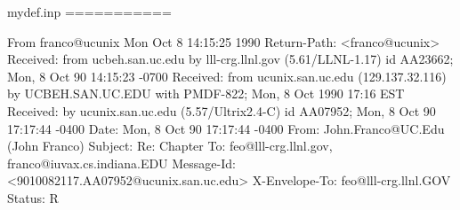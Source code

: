 mydef.inp
===========


\newcommand{\ie}{{\em i.e.}}
\newcommand{\eg}{{\em e.g.}}
\newcommand{\etc}{{\em etc.}}
\newcommand{\vs}{{\em vs.}}
\newcommand{\cf}{{\em cf.}}
\newcommand{\etal}{{\em et al.}}
\newcommand{\via}{{\em via}}


\newcommand{\g}{\gamma}
\newcommand{\r}{\rho}
\renewcommand{\l}{\lambda} %

\newcommand{\lam}{$\lambda$}

\newcommand{\sbv}[1]{\hbox{\([\![\)}\hbox{\svbt{#1}}\hbox{\(]\!]\)}}
\newcommand{\sbtt}[1]{\hbox{\([\![\)}\hbox{\tt #1}\hbox{\(]\!]\)}}
\newcommand{\svbt}[1]{{\small\tt #1}}
\newcommand{\hsvbt}[1]{\hbox{\small\tt #1}}

\newcommand{\lc}{\(\lambda\)-calculus}
\newcommand{\smn}{S^m_n}
\newcommand{\smnt}{\(S^m_n\)-theorem}


\newtheorem{lemma}{Lemma}
\newtheorem{definition}{Definition}
\newtheorem{theorem}{Theorem}
\newtheorem{proposition}{Proposition}
\newtheorem{proof}{Proof}
\newtheorem{conjecture}{Conjecture}
\newtheorem{principle}{Principle}



\def\doframeit#1{\vbox{%
  \hrule height\fboxrule
    \hbox{%
      \vrule width\fboxrule \kern\fboxsep
      \vbox{\kern\fboxsep #1\kern\fboxsep }%
      \kern\fboxsep \vrule width\fboxrule }%
    \hrule height\fboxrule }}


\def\frameit{\smallskip \advance \linewidth by -7.5pt \setbox0=\vbox \bgroup
\strut \ignorespaces }

\def\endframeit{\ifhmode \par \nointerlineskip \fi \egroup
\doframeit{\box0}}

From franco@ucunix Mon Oct  8 14:15:25 1990
Return-Path: <franco@ucunix>
Received: from ucbeh.san.uc.edu by lll-crg.llnl.gov (5.61/LLNL-1.17)
	id AA23662; Mon, 8 Oct 90 14:15:23 -0700
Received: from ucunix.san.uc.edu (129.137.32.116) by UCBEH.SAN.UC.EDU with
 PMDF-822; Mon, 8 Oct 1990 17:16 EST
Received: by ucunix.san.uc.edu (5.57/Ultrix2.4-C) id AA07952; Mon, 8 Oct 90
 17:17:44 -0400
Date: Mon, 8 Oct 90 17:17:44 -0400
From: John.Franco@UC.Edu (John Franco)
Subject: Re:  Chapter
To: feo@lll-crg.llnl.gov, franco@iuvax.cs.indiana.EDU
Message-Id: <9010082117.AA07952@ucunix.san.uc.edu>
X-Envelope-To: feo@lll-crg.llnl.GOV
Status: R

